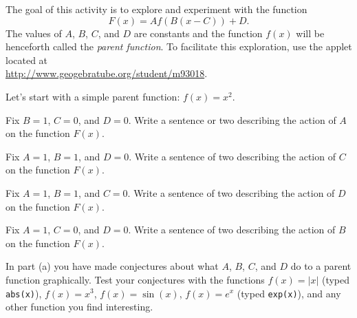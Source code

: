 \begin{pa} \label{PA:0.3}
The goal of this activity is to explore and experiment with the function
\[ F(x) = Af(B(x-C))+D. \]
The values of $A$, $B$, $C$, and $D$ are constants and the function $f(x)$ will be
henceforth called the {\it parent function}.  To facilitate this exploration, use the
applet located at \\
\href{http://www.geogebratube.org/student/m93018}{http://www.geogebratube.org/student/m93018}.
\ba
    \item Let's start with a simple parent function: $f(x) = x^2$.
        \bei
            \item Fix $B=1$, $C=0$, and $D=0$.  Write a sentence or two describing the
                action of $A$ on the function $F(x)$.
            \item Fix $A=1$, $B=1$, and $D=0$.  Write a sentence of two describing the
                action of $C$ on the function $F(x)$.
            \item Fix $A=1$, $B=1$, and $C=0$.  Write a sentence of two describing the
                action of $D$ on the function $F(x)$.
            \item Fix $A=1$, $C=0$, and $D=0$.  Write a sentence of two describing the
                action of $B$ on the function $F(x)$.
        \eei
    \item In part (a) you have made conjectures about what $A$, $B$, $C$, and $D$ do to a
        parent function graphically.  Test your conjectures with the functions $f(x) =
        |x|$ (typed \texttt{abs(x)}), $f(x) = x^3$, $f(x) = \sin(x)$, $f(x) = e^x$ (typed
        \texttt{exp(x)}), and any other function you find interesting. 
\ea
\end{pa} \afterpa

